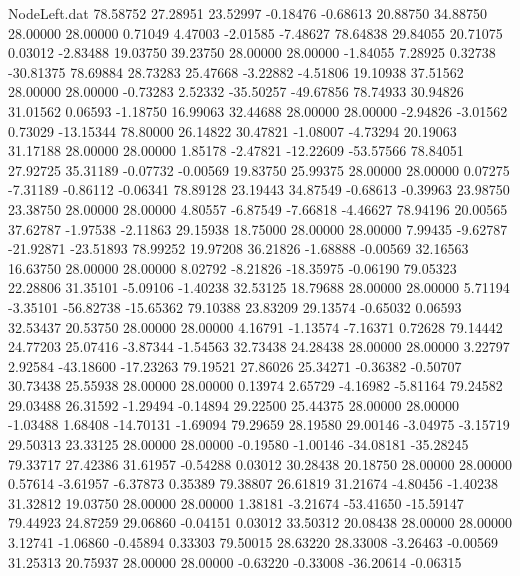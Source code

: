 \begin{filecontents}{NodeLeft.dat}
  78.58752   27.28951   23.52997    -0.18476   -0.68613   20.88750   34.88750   28.00000   28.00000    0.71049    4.47003   -2.01585   -7.48627
  78.64838   29.84055   20.71075     0.03012   -2.83488   19.03750   39.23750   28.00000   28.00000   -1.84055    7.28925    0.32738  -30.81375
  78.69884   28.73283   25.47668    -3.22882   -4.51806   19.10938   37.51562   28.00000   28.00000   -0.73283    2.52332  -35.50257  -49.67856
  78.74933   30.94826   31.01562     0.06593   -1.18750   16.99063   32.44688   28.00000   28.00000   -2.94826   -3.01562    0.73029  -13.15344
  78.80000   26.14822   30.47821    -1.08007   -4.73294   20.19063   31.17188   28.00000   28.00000    1.85178   -2.47821  -12.22609  -53.57566
  78.84051   27.92725   35.31189    -0.07732   -0.00569   19.83750   25.99375   28.00000   28.00000    0.07275   -7.31189   -0.86112   -0.06341
  78.89128   23.19443   34.87549    -0.68613   -0.39963   23.98750   23.38750   28.00000   28.00000    4.80557   -6.87549   -7.66818   -4.46627
  78.94196   20.00565   37.62787    -1.97538   -2.11863   29.15938   18.75000   28.00000   28.00000    7.99435   -9.62787  -21.92871  -23.51893
  78.99252   19.97208   36.21826    -1.68888   -0.00569   32.16563   16.63750   28.00000   28.00000    8.02792   -8.21826  -18.35975   -0.06190
  79.05323   22.28806   31.35101    -5.09106   -1.40238   32.53125   18.79688   28.00000   28.00000    5.71194   -3.35101  -56.82738  -15.65362
  79.10388   23.83209   29.13574    -0.65032    0.06593   32.53437   20.53750   28.00000   28.00000    4.16791   -1.13574   -7.16371    0.72628
  79.14442   24.77203   25.07416    -3.87344   -1.54563   32.73438   24.28438   28.00000   28.00000    3.22797    2.92584  -43.18600  -17.23263
  79.19521   27.86026   25.34271    -0.36382   -0.50707   30.73438   25.55938   28.00000   28.00000    0.13974    2.65729   -4.16982   -5.81164
  79.24582   29.03488   26.31592    -1.29494   -0.14894   29.22500   25.44375   28.00000   28.00000   -1.03488    1.68408  -14.70131   -1.69094
  79.29659   28.19580   29.00146    -3.04975   -3.15719   29.50313   23.33125   28.00000   28.00000   -0.19580   -1.00146  -34.08181  -35.28245
  79.33717   27.42386   31.61957    -0.54288    0.03012   30.28438   20.18750   28.00000   28.00000    0.57614   -3.61957   -6.37873    0.35389
  79.38807   26.61819   31.21674    -4.80456   -1.40238   31.32812   19.03750   28.00000   28.00000    1.38181   -3.21674  -53.41650  -15.59147
  79.44923   24.87259   29.06860    -0.04151    0.03012   33.50312   20.08438   28.00000   28.00000    3.12741   -1.06860   -0.45894    0.33303
  79.50015   28.63220   28.33008    -3.26463   -0.00569   31.25313   20.75937   28.00000   28.00000   -0.63220   -0.33008  -36.20614   -0.06315

\end{filecontents}

